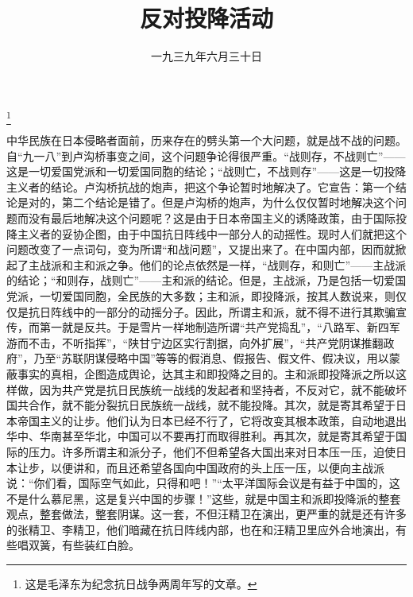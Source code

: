 
\title{反对投降活动}
\date{一九三九年六月三十日}
\thanks{这是毛泽东为纪念抗日战争两周年写的文章。}
\maketitle


中华民族在日本侵略者面前，历来存在的劈头第一个大问题，就是战不战的问题。自“九一八”到卢沟桥事变之间，这个问题争论得很严重。“战则存，不战则亡”——这是一切爱国党派和一切爱国同胞的结论；“战则亡，不战则存”——这是一切投降主义者的结论。卢沟桥抗战的炮声，把这个争论暂时地解决了。它宣告：第一个结论是对的，第二个结论是错了。但是卢沟桥的炮声，为什么仅仅暂时地解决这个问题而没有最后地解决这个问题呢？这是由于日本帝国主义的诱降政策，由于国际投降主义者的妥协企图，由于中国抗日阵线中一部分人的动摇性。现时人们就把这个问题改变了一点词句，变为所谓“和战问题”，又提出来了。在中国内部，因而就掀起了主战派和主和派之争。他们的论点依然是一样，“战则存，和则亡”——主战派的结论；“和则存，战则亡”——主和派的结论。但是，主战派，乃是包括一切爱国党派，一切爱国同胞，全民族的大多数；主和派，即投降派，按其人数说来，则仅仅是抗日阵线中的一部分的动摇分子。因此，所谓主和派，就不得不进行其欺骗宣传，而第一就是反共。于是雪片一样地制造所谓“共产党捣乱”，“八路军、新四军游而不击，不听指挥”，“陕甘宁边区实行割据，向外扩展”，“共产党阴谋推翻政府”，乃至“苏联阴谋侵略中国”等等的假消息、假报告、假文件、假决议，用以蒙蔽事实的真相，企图造成舆论，达其主和即投降之目的。主和派即投降派之所以这样做，因为共产党是抗日民族统一战线的发起者和坚持者，不反对它，就不能破坏国共合作，就不能分裂抗日民族统一战线，就不能投降。其次，就是寄其希望于日本帝国主义的让步。他们认为日本已经不行了，它将改变其根本政策，自动地退出华中、华南甚至华北，中国可以不要再打而取得胜利。再其次，就是寄其希望于国际的压力。许多所谓主和派分子，他们不但希望各大国出来对日本压一压，迫使日本让步，以便讲和，而且还希望各国向中国政府的头上压一压，以便向主战派说：“你们看，国际空气如此，只得和吧！”“太平洋国际会议是有益于中国的，这不是什么慕尼黑，这是复兴中国的步骤！”这些，就是中国主和派即投降派的整套观点，整套做法，整套阴谋。这一套，不但汪精卫在演出，更严重的就是还有许多的张精卫、李精卫，他们暗藏在抗日阵线内部，也在和汪精卫里应外合地演出，有些唱双簧，有些装红白脸。


